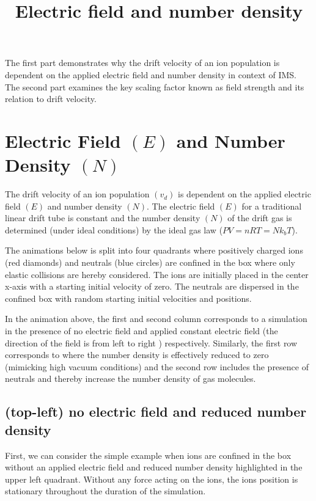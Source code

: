 \documentclass[10pt,a4paper,final]{article}
\title{Electric field and number density}
\begin{document}
The first part demonstrates why the drift velocity of an ion population is dependent on the applied electric field and number density in context of IMS. The second part examines the key scaling factor known as field strength and its relation to drift velocity.


\section{Electric Field $(E)$ and Number Density $(N)$}


The drift velocity of an ion population $(v_d)$ is dependent on the applied electric field $(E)$ and number density $(N)$. 
The electric field $(E)$ for a traditional linear drift tube is constant and the number density $(N)$ of the drift gas is determined (under ideal conditions) by the ideal gas law ($PV=nRT=Nk_bT$).

The animations below is split into four quadrants where positively charged ions (red diamonds) and neutrals (blue circles) are confined in the box where only elastic collisions are hereby considered. The ions are initially placed in the center x-axis with a starting initial velocity of zero. The neutrals are dispersed in the confined box with random starting initial velocities and positions.

In the animation above, the first and second column corresponds to a simulation in the presence of no electric field and applied constant electric field (the direction of the field is from left to right ) respectively. Similarly, the first row corresponds to where the number density is effectively reduced to zero (mimicking high vacuum conditions) and the second row includes the presence of neutrals and thereby increase the number density of gas molecules.


\subsection{(top-left) no electric field and reduced number density}
First, we can consider the simple example when ions are confined in the box without an applied electric field and reduced number density highlighted in the upper left quadrant. Without any force acting on the ions, the ions position is stationary throughout the duration of the simulation.
\end{document}
